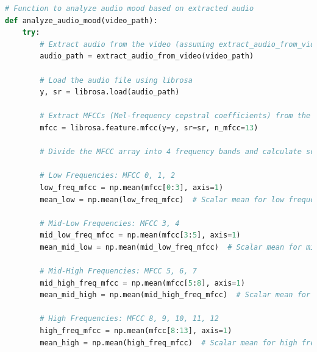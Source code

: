 \begin{tcolorbox}[colback=gray!5!white, colframe=gray!80!black, boxrule=0.5pt, title=Analyze Audio Mood Based on Extracted Audio]
    \begin{lstlisting}[language=Python]
# Function to analyze audio mood based on extracted audio
def analyze_audio_mood(video_path):
    try:
        # Extract audio from the video (assuming extract_audio_from_video is implemented)
        audio_path = extract_audio_from_video(video_path)

        # Load the audio file using librosa
        y, sr = librosa.load(audio_path)

        # Extract MFCCs (Mel-frequency cepstral coefficients) from the audio signal
        mfcc = librosa.feature.mfcc(y=y, sr=sr, n_mfcc=13)

        # Divide the MFCC array into 4 frequency bands and calculate scalar mean for each band

        # Low Frequencies: MFCC 0, 1, 2
        low_freq_mfcc = np.mean(mfcc[0:3], axis=1)
        mean_low = np.mean(low_freq_mfcc)  # Scalar mean for low frequencies

        # Mid-Low Frequencies: MFCC 3, 4
        mid_low_freq_mfcc = np.mean(mfcc[3:5], axis=1)
        mean_mid_low = np.mean(mid_low_freq_mfcc)  # Scalar mean for mid-low frequencies

        # Mid-High Frequencies: MFCC 5, 6, 7
        mid_high_freq_mfcc = np.mean(mfcc[5:8], axis=1)
        mean_mid_high = np.mean(mid_high_freq_mfcc)  # Scalar mean for mid-high frequencies

        # High Frequencies: MFCC 8, 9, 10, 11, 12
        high_freq_mfcc = np.mean(mfcc[8:13], axis=1)
        mean_high = np.mean(high_freq_mfcc)  # Scalar mean for high frequencies
    \end{lstlisting}
\end{tcolorbox}

